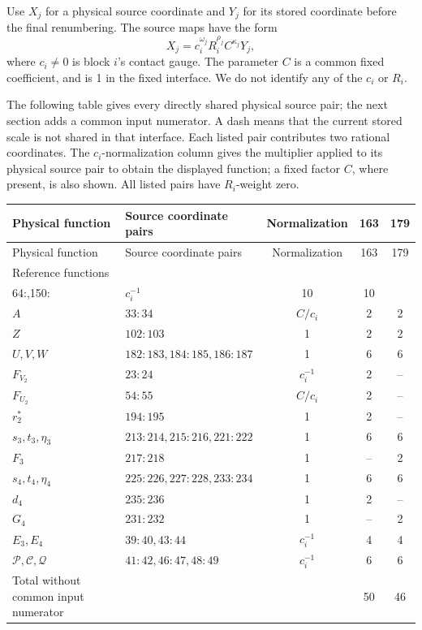 \documentclass[11pt]{article}
\begin{document}
Use \(X_j\) for a physical source coordinate and \(Y_j\) for its stored
coordinate before the final renumbering.  The source maps have the form
\begin{equation}\label{eq:physical-laurent-map}
                 X_j=c_i^{\omega_j}R_i^{\rho_j}
                       C^{\kappa_j}Y_j,
\end{equation}
where \(c_i\ne0\) is block \(i\)'s contact gauge.  The parameter \(C\)
is a common fixed coefficient, and is 1 in the fixed interface.  We do
not identify any of the \(c_i\) or \(R_i\).

The following table gives every directly shared physical source pair;
the next section adds a common input numerator.
A dash means that the current stored scale is not shared in that
interface.  Each listed pair contributes two rational coordinates.
The \(c_i\)-normalization column gives the multiplier applied to its physical
source pair to obtain the displayed function; a fixed
factor \(C\), where present, is also shown.  All listed pairs have
\(R_i\)-weight zero.

\begin{center}\small
\begin{longtable}{@{}p{34mm}p{41mm}c c c@{}}
\toprule
Physical function & Source coordinate pairs & Normalization & 163 & 179\\
\midrule\endfirsthead
\toprule
Physical function & Source coordinate pairs & Normalization & 163 & 179\\
\midrule\endhead
Reference functions & \(\begin{gathered}15\!:\!16,17\!:\!18,19\!:\!20\\64\!:\!65,150\!:\!151\end{gathered}\)
 & \(c_i^{-1}\) & 10 & 10\\
\(A\) & \(33\!:\!34\) & \(C/c_i\) & 2 & 2\\
\(Z\) & \(102\!:\!103\) & 1 & 2 & 2\\
\(U,V,W\) & \(182\!:\!183,184\!:\!185,186\!:\!187\) & 1 & 6 & 6\\
\(F_{V_2}\) & \(23\!:\!24\) & \(c_i^{-1}\) & 2 & --\\
\(F_{U_2}\) & \(54\!:\!55\) & \(C/c_i\) & 2 & --\\
\(r_2^*\) & \(194\!:\!195\) & 1 & 2 & --\\
\(s_3,t_3,\eta_3\) & \(213\!:\!214,215\!:\!216,221\!:\!222\) & 1 & 6 & 6\\
\(F_3\) & \(217\!:\!218\) & 1 & -- & 2\\
\(s_4,t_4,\eta_4\) & \(225\!:\!226,227\!:\!228,233\!:\!234\) & 1 & 6 & 6\\
\(d_4\) & \(235\!:\!236\) & 1 & 2 & --\\
\(G_4\) & \(231\!:\!232\) & 1 & -- & 2\\
\(E_3,E_4\) & \(39\!:\!40,43\!:\!44\) & \(c_i^{-1}\) & 4 & 4\\
\(\mathcal P,\mathcal C,\mathcal Q\) & \(41\!:\!42,46\!:\!47,48\!:\!49\)
 & \(c_i^{-1}\) & 6 & 6\\
\midrule
Total without common input numerator &&&50&46\\
\bottomrule
\end{longtable}
\end{center}
\end{document}
